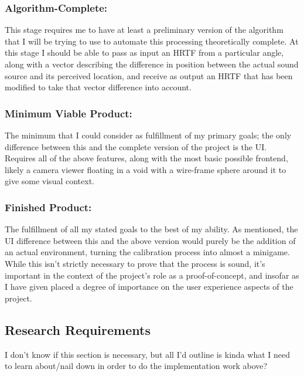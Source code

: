\documentclass[10pt, oneside, a4paper, draft]{scrartcl}
\begin{document}
\subsubsection*{Algorithm-Complete:}

This stage requires me to have at least a preliminary version of the algorithm that I will be trying to use to automate this processing theoretically complete. At this stage I should be able to pass as input an HRTF from a particular angle, along with a vector describing the difference in position between the actual sound source and its perceived location, and receive as output an HRTF that has been modified to take that vector difference into account.

\subsubsection*{Minimum Viable Product:}

The minimum that I could consider as fulfillment of my primary goals; the only difference between this and the complete version of the project is the UI. Requires all of the above features, along with the most basic possible frontend, likely a camera viewer floating in a void with a wire-frame sphere around it to give some visual context. 

\subsubsection*{Finished Product:}

The fulfillment of all my stated goals to the best of my ability. As mentioned, the UI difference between this and the above version would purely be the addition of an actual environment, turning the calibration process into almost a minigame. While this isn't strictly necessary to prove that the process is sound, it's important in the context of the project's role as a proof-of-concept, and insofar as I have given placed a degree of importance on the user experience aspects of the project. 

\subsection*{Research Requirements} %

I don't know if this section is necessary, but all I'd outline is kinda what I need to learn about/nail down in order to do the implementation work above? 
\end{document}
